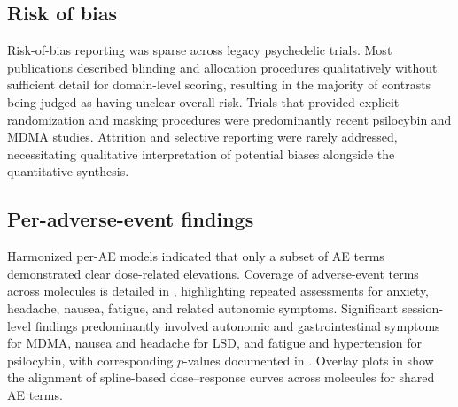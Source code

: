 \subsection{Risk of bias}
Risk-of-bias reporting was sparse across legacy psychedelic trials. Most publications described blinding and allocation procedures qualitatively without sufficient detail for domain-level scoring, resulting in the majority of contrasts being judged as having unclear overall risk. Trials that provided explicit randomization and masking procedures were predominantly recent psilocybin and MDMA studies. Attrition and selective reporting were rarely addressed, necessitating qualitative interpretation of potential biases alongside the quantitative synthesis.

\subsection{Per-adverse-event findings}
Harmonized per-AE models indicated that only a subset of AE terms demonstrated clear dose-related elevations. Coverage of adverse-event terms across molecules is detailed in , highlighting repeated assessments for anxiety, headache, nausea, fatigue, and related autonomic symptoms. Significant session-level findings predominantly involved autonomic and gastrointestinal symptoms for MDMA, nausea and headache for LSD, and fatigue and hypertension for psilocybin, with corresponding $p$-values documented in . Overlay plots in  show the alignment of spline-based dose--response curves across molecules for shared AE terms.



